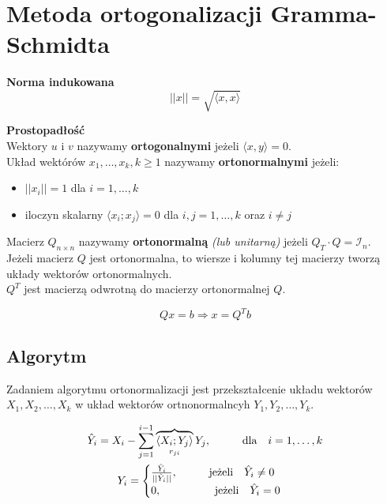 \documentclass[../mn-notatki.tex]{subfiles}
\begin{document}
\section{Metoda ortogonalizacji Gramma-Schmidta}

\begin{tcolorbox}
\textbf{Norma indukowana}
\[
||x|| = \sqrt{\langle x,x \rangle}
\]
\end{tcolorbox}

\begin{tcolorbox}
\textbf{Prostopadłość}\\
Wektory $u$ i $v$ nazywamy \textbf{ortogonalnymi} jeżeli $\langle x,y \rangle = 0$.\\
Układ wektórów $x_1, \ldots, x_k, k \geqslant 1$ nazywamy \textbf{ortonormalnymi}
jeżeli:
\begin{itemize}
    \item $||x_i|| = 1$ dla $i = 1, \ldots, k$
    \item iloczyn skalarny $\langle x_i; x_j \rangle = 0$ dla $i,j = 1, \ldots, k$ oraz $i \neq j$
\end{itemize}
\end{tcolorbox}

\begin{tcolorbox}
Macierz $Q_{n\times n}$ nazywamy \textbf{ortonormalną} \textit{(lub unitarną)}
jeżeli $Q_T \cdot Q = \mathcal{I}_n$.\\

Jeżeli macierz $Q$ jest ortonormalna, to wiersze i kolumny tej macierzy
tworzą układy wektorów ortonormalnych.\\

$Q^T$ jest macierzą odwrotną do macierzy ortonormalnej $Q$.
\end{tcolorbox}

\begin{tcolorbox}
\[
Qx = b \Rightarrow x = Q^T b
\]
\end{tcolorbox}

\subsection{Algorytm}
\begin{tcolorbox}
Zadaniem algorytmu ortonormalizacji jest przekształcenie układu
wektorów $X_1 ,X_2 ,\ldots,X_k$ w układ wektorów ortnonormalncyh $Y_1 ,Y_2 ,\ldots,Y_k$.
\end{tcolorbox}

\begin{gather*}
\hat{Y}_i = X_i - \sum_{j=1}^{i-1} \overbrace{\langle X_i; Y_j \rangle}_{r_{ji}} Y_j, \hspace*{1cm} \text{dla~~ } i = 1, \ldots, k\\
Y_i =
\begin{cases}
\frac{\hat{Y}_i}{||\hat{Y}_i|| }, \hspace*{1cm} \text{jeżeli~~ } \hat{Y}_i \neq 0\\
0, \hspace*{1cm} \text{~~~~~~jeżeli~~ } \hat{Y}_i = 0
\end{cases}
\end{gather*}
\end{document}
